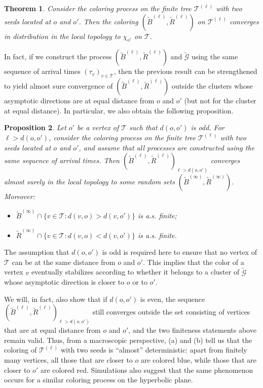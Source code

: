 \documentclass[french]{article}
\newtheorem{theorem}{Theorem}
\newtheorem{prop}[theorem]{Proposition}
\newcommand{\T}{\mathcal{T}}
\renewcommand{\1}{\mathds{1}}
\begin{document}
\begin{theorem}\label{theo:twoseed} Consider the coloring process on the finite tree $\T^{(\ell)}$ with two seeds located at $o$ and $o'$. Then the coloring $(\tilde{B}^{(\ell)},\tilde{R}^{(\ell)})$ on $\T^{(\ell)}$ converges in distribution in the local topology to $\chi_{o'}$ on $\T$.
\end{theorem}


In fact, if we construct the process $(\tilde{B}^{(\ell)},\tilde{R}^{(\ell)})$ and $\tilde{\mathcal G}$ using the same sequence of arrival times $(\tau_v)_{v \in \T}$, then the previous result can be strengthened to yield almost sure convergence of $(\tilde{B}^{(\ell)},\tilde{R}^{(\ell)})$ outside the clusters whose asymptotic directions are at equal distance from $o$ and $o'$ (but not for the cluster at equal distance). In particular, we also obtain the following proposition.

\begin{prop}\label{prop:twoseed}
Let $o'$ be a vertex of $\T$ such that $d(o,o')$ is odd. For $\ell > d(o,o')$, consider the coloring process on the finite tree $\T^{(\ell)}$ with two seeds located at $o$ and $o'$, and assume that all processes are constructed using the same sequence of arrival times. Then $
(\tilde{B}^{(\ell)},\tilde{R}^{(\ell)})_{\ell > d(o,o')}
$
converges almost surely in the local topology to some random sets
$
(\tilde{B}^{(\infty)},\tilde{R}^{(\infty)}).
$
Moreover:
\begin{itemize}
    \item[\textup{(a)}]
    $\tilde{B}^{(\infty)} \cap \{v \in \T : d(v,o)>d(v,o')\}$ is a.s. finite;
    
    \item[\textup{(b)}]
    $\tilde{R}^{(\infty)} \cap \{v \in \T : d(v,o)<d(v,o')\}$ is a.s. finite.
\end{itemize}
\end{prop}

The assumption that $d(o,o')$ is odd is required here to ensure that no vertex of $\T$ can be at the same distance from $o$ and $o'$. This implies that the color of a vertex $v$ eventually stabilizes according to whether it belongs to a cluster of $\tilde{\mathcal G}$ whose asymptotic direction is closer to $o$ or to $o'$.

We will, in fact, also show that if $d(o,o')$ is even, the sequence $(\tilde{B}^{(\ell)},\tilde{R}^{(\ell)})_{\ell > d(o,o')}$ still converges outside the set consisting of vertices that are at equal distance from $o$ and $o'$, and the two finiteness statements above remain valid.
Thus, from a macroscopic perspective, (a) and (b) tell us that the coloring of $\T^{(\ell)}$ with two seeds is ``almost'' deterministic: apart from finitely many vertices, all those that are closer to $o$ are colored blue, while those that are closer to $o'$ are colored red. Simulations also suggest that the same phenomenon occurs for a similar coloring process on the hyperbolic plane.
\end{document}
